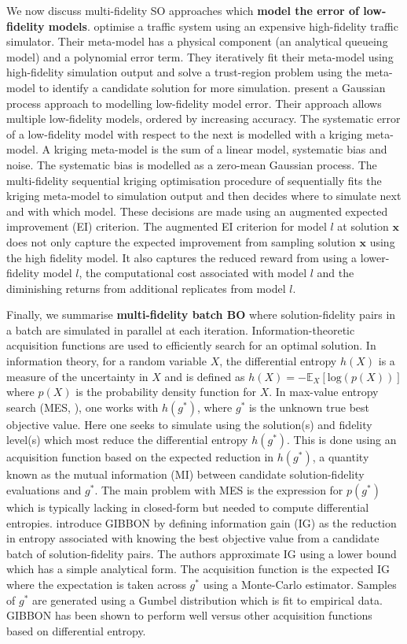 \documentclass[12pt,a4paper]{article}
\begin{document}
We now discuss multi-fidelity SO approaches which \textbf{model the error of low-fidelity models}. \cite{chong2018simulation} optimise a traffic system using an expensive high-fidelity traffic simulator. Their meta-model has a physical component (an analytical queueing model) and a polynomial error term. They iteratively fit their meta-model using high-fidelity simulation output and solve a trust-region problem using the meta-model to identify a candidate solution for more simulation. \cite{huang2006sequential} present a Gaussian process approach to modelling low-fidelity model error. Their approach allows multiple low-fidelity models, ordered by increasing accuracy. The systematic error of a low-fidelity model with respect to the next is modelled with a kriging meta-model. A kriging meta-model is the sum of a linear model, systematic bias and noise. The systematic bias is modelled as a zero-mean Gaussian process. The multi-fidelity sequential kriging optimisation procedure of \cite{huang2006sequential} sequentially fits the kriging meta-model to simulation output and then decides where to simulate next and with which model. These decisions are made using an augmented expected improvement (EI) criterion. The augmented EI criterion for model $l$ at solution $\boldsymbol{x}$ does not only capture the expected improvement from sampling solution $\boldsymbol{x}$ using the high fidelity model. It also captures the reduced reward from using a lower-fidelity model $l$, the computational cost associated with model $l$ and the diminishing returns from additional replicates from model $l$.

Finally, we summarise \textbf{multi-fidelity batch BO} where solution-fidelity pairs in a batch are simulated in parallel at each iteration. Information-theoretic acquisition functions are used to efficiently search for an optimal solution. In information theory, for a random variable $X$, the differential entropy $h(X)$ is a measure of the uncertainty in $X$ and is defined as $h(X) = -\mathbb{E}_{X}[\text{log}(p(X))]$ where $p(X)$ is the probability density function for $X$. In max-value entropy search (MES, \cite{wang2017max}), one works with $h(g^{*})$, where $g^{*}$ is the unknown true best objective value. Here one seeks to simulate using the solution(s) and fidelity level(s) which most reduce the differential entropy  $h(g^{*})$. This is done using an acquisition function based on the expected reduction in $h(g^{*})$, a quantity known as the mutual information (MI) between candidate solution-fidelity evaluations and $g^{*}$. The main problem with MES is the expression for $p(g^{*})$ which is typically lacking in closed-form but needed to compute differential entropies. \cite{moss2021gibbon} introduce GIBBON by defining information gain (IG) as the reduction in entropy associated with knowing the best objective value from a candidate batch of solution-fidelity pairs. The authors approximate IG using a lower bound which has a simple analytical form. The acquisition function is the expected IG where the expectation is taken across $g^{*}$ using a Monte-Carlo estimator. Samples of $g^{*}$ are generated using a Gumbel distribution which is fit to empirical data. GIBBON has been shown to perform well versus other acquisition functions based on differential entropy. 
\end{document}

